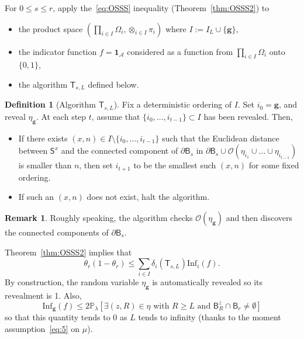\documentclass[10pt]{amsart}
\theoremstyle{definition}\newtheorem{defi}[theo]{Definition}\newtheorem{rema}[theo]{Remark}\newtheorem{exam}[theo]{Example}\newtheorem{exem}[theo]{Example}\newtheorem{nota}[theo]{Notation}
\newcommand{\infl}{\mathrm{Inf}}
\newcommand{\gbf}{\mathbf{g}}
\begin{document}
For $0\le s\le r$, apply the~\eqref{eq:OSSS} inequality (Theorem~\ref{thm:OSSS2}) to
\begin{itemize}%
\item the product space $(\prod_{i\in I}\Omega_i,\otimes_{i\in I}\pi_i)$ where $I:=I_L\cup\{{\gbf}\}$,
\item the indicator function $f=\mathbf 1_{\mathcal A}$ considered as a function from $\prod_{i\in I}\Omega_i$ onto $\{0,1\}$,
\item the algorithm $\mathsf T_{s,L}$ defined below.
\end{itemize}
\begin{defi}[Algorithm $\mathsf T_{s,L}$]
Fix a deterministic ordering of $I$. Set $i_0 = {\gbf}$, and reveal $\eta_{\gbf}$. At each step $t$, assume that $\{i_0,\dots,i_{t-1}\} \subset I$ has been revealed. Then,
\begin{itemize}
\item If there exists $(x,n) \in I\setminus \{i_0,\dots,i_{t-1}\}$ such that the Euclidean distance between $\mathsf S^x$ and the connected component of $\partial\mathsf B_s$ in $\partial\mathsf B_s\cup{\mathcal O}(\eta_{i_1}\cup\dots\cup\eta_{i_{t-1}})$ is smaller than $n$, then set $i_{t+1}$ to be the smallest such $(x,n)$ for some fixed ordering.
\item If such an $(x,n)$ does not exist, halt the algorithm.
\end{itemize}
\end{defi}

\begin{rema}
Roughly speaking, the algorithm checks ${\mathcal O}(\eta_{\gbf})$ and then discovers the connected components of $\partial\mathsf B_s$.
\end{rema}

Theorem~\ref{thm:OSSS2} implies that
\begin{equation}\label{eq:OSSSa}
\theta_{r}(1-\theta_{r}) \leq \sum_{i\in I} \delta_{i}(\mathsf T_{s,L}) \infl_i(f).
\end{equation}
By construction, the random variable $\eta_{\gbf}$ is automatically revealed so its revealment is 1. Also,
\begin{equation}\label{eq:r1}
\infl_{\gbf}(f)\le 2{\mathbb P}_\lambda[\exists (z,R)\in\eta \text{ with } R\ge L \text{ and }\mathsf B_R^z\cap \mathsf B_r\ne \emptyset]
\end{equation}
so that this quantity tends to 0 as $L$ tends to infinity (thanks to the moment assumption~\eqref{eq:5} on $\mu$).
\end{document}
